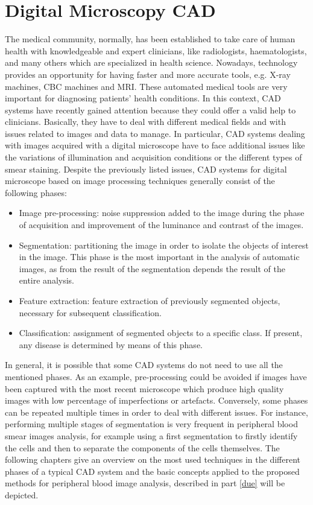 \documentclass[final,a4paper,12pt,english]{UnicaPhdThesis3}
\begin{document}
	\part{Digital Microscopy CAD} \label{uno}
	The medical community, normally, has been established to take care of human health with knowledgeable and expert clinicians, like radiologists, haematologists, and many others which are specialized in health science. Nowadays, technology provides an opportunity for having faster and more accurate tools, e.g. X-ray machines, CBC machines and MRI. These automated medical tools are very important for diagnosing patients' health conditions. In this context, CAD systems have recently gained attention because they could offer a valid help to clinicians. Basically, they have to deal with different medical fields and with issues related to images and data to manage. In particular, CAD systems dealing with images acquired with a digital microscope have to face additional issues like the variations of illumination and acquisition conditions or the different types of smear staining. Despite the previously listed issues, CAD systems for digital microscope based on image processing techniques generally consist of the following phases:
	\begin{itemize}
		\item Image pre-processing: noise suppression added to the image during the phase of acquisition and improvement of the luminance and contrast of the images.
		\item Segmentation: partitioning the image in order to isolate the objects of interest in the image. This phase is the most important in the analysis of automatic images, as from the result of the segmentation depends the result of the entire analysis.
		\item Feature extraction: feature extraction of previously segmented objects, necessary for subsequent classification.
		\item Classification: assignment of segmented objects to a specific class. If present, any disease is determined by means of this phase. 
	\end{itemize}
	
	In general, it is possible that some CAD systems do not need to use all the mentioned phases. As an example, pre-processing could be avoided if images have been captured with the most recent microscope which produce high quality images with low percentage of imperfections or artefacts. Conversely, some phases can be repeated multiple times in order to deal with different issues. For instance, performing multiple stages of segmentation is very frequent in peripheral blood smear images analysis, for example using a first segmentation to firstly identify the cells and then to separate the components of the cells themselves. 
	The following chapters give an overview on the most used techniques in the different phases of a typical CAD system and the basic concepts applied to the proposed methods for peripheral blood image analysis, described in part \ref{due} will be depicted.
	
\end{document}
